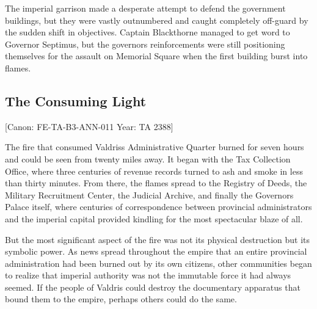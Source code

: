 The imperial garrison made a desperate attempt to defend the government
buildings, but they were vastly outnumbered and caught completely
off-guard by the sudden shift in objectives. Captain Blackthorne managed
to get word to Governor Septimus, but the governor\textquotesingle s
reinforcements were still positioning themselves for the assault on
Memorial Square when the first building burst into flames.

\subsection{The Consuming Light}\label{the-consuming-light}

{[}Canon: FE-TA-B3-ANN-011 \textbar{} Year: TA 2388{]}

The fire that consumed Valdris\textquotesingle s Administrative Quarter
burned for seven hours and could be seen from twenty miles away. It
began with the Tax Collection Office, where three centuries of revenue
records turned to ash and smoke in less than thirty minutes. From there,
the flames spread to the Registry of Deeds, the Military Recruitment
Center, the Judicial Archive, and finally the Governor\textquotesingle s
Palace itself, where centuries of correspondence between provincial
administrators and the imperial capital provided kindling for the most
spectacular blaze of all.

But the most significant aspect of the fire was not its physical
destruction but its symbolic power. As news spread throughout the empire
that an entire provincial administration had been burned out by its own
citizens, other communities began to realize that imperial authority was
not the immutable force it had always seemed. If the people of Valdris
could destroy the documentary apparatus that bound them to the empire,
perhaps others could do the same.

